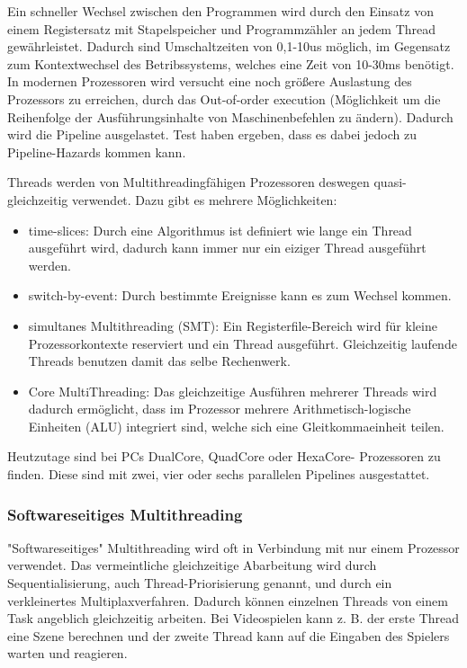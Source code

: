 \documentclass[12pt,a4paper]{report}
\begin{document}
Ein schneller Wechsel zwischen den Programmen wird durch den Einsatz von einem Registersatz mit Stapelspeicher und Programmzähler an jedem Thread gewährleistet. Dadurch sind Umschaltzeiten von 0,1-10us möglich, im Gegensatz zum Kontextwechsel des Betribssystems, welches eine Zeit von 10-30ms benötigt.\\

In modernen Prozessoren wird versucht eine noch größere Auslastung des Prozessors zu erreichen, durch das Out-of-order execution (Möglichkeit um die Reihenfolge der Ausführungsinhalte von Maschinenbefehlen zu ändern). Dadurch wird die Pipeline ausgelastet. Test haben ergeben, dass es dabei jedoch zu Pipeline-Hazards kommen kann.

Threads werden von Multithreadingfähigen Prozessoren deswegen quasi-gleichzeitig verwendet. Dazu gibt es mehrere Möglichkeiten:
\begin{itemize}
\item time-slices: Durch eine Algorithmus ist definiert wie lange ein Thread ausgeführt wird, dadurch kann immer nur ein eiziger Thread ausgeführt werden.
\item switch-by-event: Durch bestimmte Ereignisse kann es zum Wechsel kommen.
\item simultanes Multithreading (SMT): Ein Registerfile-Bereich wird für kleine Prozessorkontexte reserviert und ein Thread ausgeführt. Gleichzeitig laufende Threads benutzen damit das selbe Rechenwerk.
\item Core MultiThreading: Das gleichzeitige Ausführen mehrerer Threads wird dadurch ermöglicht, dass im Prozessor mehrere Arithmetisch-logische Einheiten (ALU) integriert sind, welche sich eine Gleitkommaeinheit teilen.
\end{itemize}
Heutzutage sind bei PCs DualCore, QuadCore oder HexaCore- Prozessoren zu finden. Diese sind mit zwei, vier oder sechs parallelen Pipelines ausgestattet.


\subsubsection{Softwareseitiges Multithreading}
"{}Softwareseitiges"{} Multithreading wird oft in Verbindung mit nur einem Prozessor verwendet. Das vermeintliche gleichzeitige Abarbeitung wird durch Sequentialisierung, auch Thread-Priorisierung genannt, und durch ein verkleinertes Multiplaxverfahren. Dadurch können einzelnen Threads von einem Task angeblich gleichzeitig arbeiten. Bei Videospielen kann z. B. der erste Thread eine Szene berechnen und der zweite Thread kann auf die Eingaben des Spielers warten und reagieren.\\
\end{document}

